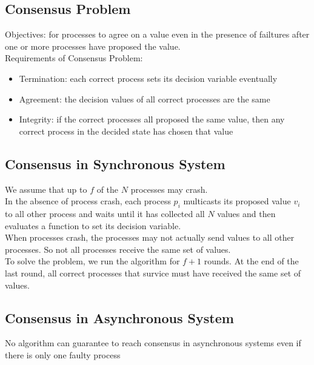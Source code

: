 \begin{multicols*}{2}
\section{Consensus Problem}

\noindent Objectives: for processes to agree on a value even in the presence of failtures after one or more processes have proposed the value.\\

\noindent Requirements of Consensus Problem:
\begin{itemize}
  \item Termination: each correct process sets its decision variable eventually
  \item Agreement: the decision values of all correct processes are the same
  \item Integrity: if the correct processes all proposed the same value, then any correct process in the decided state has chosen that value
\end{itemize}

\subsection{Consensus in Synchronous System}

\noindent We assume that up to $f$ of the $N$ processes may crash.\\

\noindent In the absence of process crash, each process $p_i$ multicasts its proposed value $v_i$ to all other process and waits until it has collected all $N$ values and then evaluates a function to set its decision variable.\\

\noindent When processes crash, the processes may not actually send values to all other processes. So not all processes receive the same set of values.\\

\noindent To solve the problem, we run the algorithm for $f+1$ rounds. At the end of the last round, all correct processes that survice must have received the same set of values. 

\subsection{Consensus in Asynchronous System}

\noindent No algorithm can guarantee to reach consensus in asynchronous systems even if there is only one faulty process

\end{multicols*}
